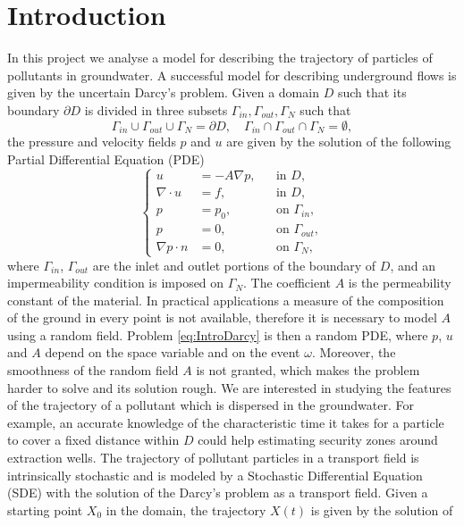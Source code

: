\section{Introduction}

In this project we analyse a model for describing the trajectory of particles of pollutants in groundwater. A successful model for describing underground flows is given by the uncertain Darcy's problem. Given a domain $D$ such that its boundary $\partial D$ is divided in three subsets $\Gamma_{in}, \Gamma_{out}, \Gamma_N$ such that 
\begin{equation*}
	\Gamma_{in} \cup \Gamma_{out} \cup \Gamma_N = \partial D, \quad \Gamma_{in} \cap \Gamma_{out} \cap \Gamma_N = \emptyset,
\end{equation*} 
the pressure and velocity fields $p$ and $u$ are given by the solution of the following Partial Differential Equation (PDE)
\begin{equation}
	\label{eq:IntroDarcy}
	\left \{
  	\begin{aligned}
		u &= -A \nabla p, && \text{in } D, \\
		\nabla\cdot u &= f, && \text{in } D, \\
		p &= p_0, && \text{on } \Gamma_{in},\\
		p &= 0, && \text{on } \Gamma_{out}, \\
		\nabla p \cdot n &= 0, && \text{on } \Gamma_N,
	\end{aligned} \right.
\end{equation}
where $\Gamma_{in}$, $\Gamma_{out}$ are the inlet and outlet portions of the boundary of $D$, and an impermeability condition is imposed on $\Gamma_N$. The coefficient $A$ is the permeability constant of the material. In practical applications a measure of the composition of the ground in every point is not available, therefore it is necessary to model $A$ using a random field. Problem \eqref{eq:IntroDarcy} is then a random PDE, where $p$, $u$ and $A$ depend on the space variable and on the event $\omega$. Moreover, the smoothness of the random field $A$ is not granted, which makes the problem harder to solve and its solution rough. We are interested in studying the features of the trajectory of a pollutant which is dispersed in the groundwater. For example, an accurate knowledge of the characteristic time it takes for a particle to cover a fixed distance within $D$ could help estimating security zones around extraction wells. The trajectory of pollutant particles in a transport field is intrinsically stochastic and is modeled by a Stochastic Differential Equation (SDE) with the solution of the Darcy's problem as a transport field. Given a starting point $X_0$ in the domain, the trajectory $X(t)$ is given by the solution of
